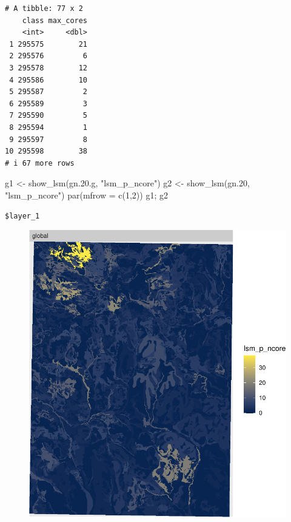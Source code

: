 \documentclass[
  letterpaper,
  DIV=11,
  numbers=noendperiod]{scrartcl}
\newenvironment{Shaded}{\begin{snugshade}}{\end{snugshade}}
\newcommand{\AttributeTok}[1]{\textcolor[rgb]{0.40,0.45,0.13}{#1}}
\newcommand{\DecValTok}[1]{\textcolor[rgb]{0.68,0.00,0.00}{#1}}
\newcommand{\FloatTok}[1]{\textcolor[rgb]{0.68,0.00,0.00}{#1}}
\newcommand{\FunctionTok}[1]{\textcolor[rgb]{0.28,0.35,0.67}{#1}}
\newcommand{\NormalTok}[1]{\textcolor[rgb]{0.00,0.23,0.31}{#1}}
\newcommand{\OtherTok}[1]{\textcolor[rgb]{0.00,0.23,0.31}{#1}}
\newcommand{\StringTok}[1]{\textcolor[rgb]{0.13,0.47,0.30}{#1}}
\begin{document}
\begin{verbatim}
# A tibble: 77 x 2
    class max_cores
    <int>     <dbl>
 1 295575        21
 2 295576         6
 3 295578        12
 4 295586        10
 5 295587         2
 6 295589         3
 7 295590         5
 8 295594         1
 9 295597         8
10 295598        38
# i 67 more rows
\end{verbatim}

\begin{Shaded}
\begin{Highlighting}[]
\NormalTok{g1 }\OtherTok{\textless{}{-}} \FunctionTok{show\_lsm}\NormalTok{(gn.}\FloatTok{20.}\NormalTok{g, }\StringTok{"lsm\_p\_ncore"}\NormalTok{)}
\NormalTok{g2 }\OtherTok{\textless{}{-}} \FunctionTok{show\_lsm}\NormalTok{(gn}\FloatTok{.20}\NormalTok{, }\StringTok{"lsm\_p\_ncore"}\NormalTok{)}
\FunctionTok{par}\NormalTok{(}\AttributeTok{mfrow =} \FunctionTok{c}\NormalTok{(}\DecValTok{1}\NormalTok{,}\DecValTok{2}\NormalTok{))}
\NormalTok{g1; g2}
\end{Highlighting}
\end{Shaded}

\begin{verbatim}
$layer_1
\end{verbatim}

\begin{figure}[H]

{\centering \includegraphics{PatternAnalysisWorkshopTutorial_files/figure-pdf/cores-general-1.pdf}

}

\end{figure}
\end{document}
